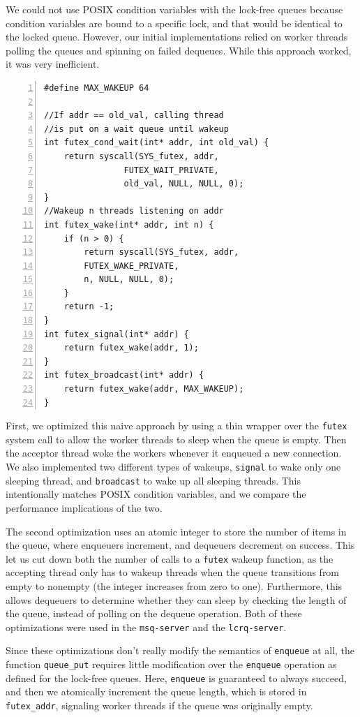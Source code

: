 \documentclass[twoside,10pt]{article}
\begin{document}
\begin{multicols}{2}
We could not use POSIX condition variables with the lock-free queues
because condition variables are bound to a specific lock, and that
would be identical to the locked queue. However, our initial
implementations relied on worker threads polling the queues and
spinning on failed dequeues. While this approach worked, it was very
inefficient. 

\begin{Verbatim}[numbers=left,
                 fontsize=\small]
#define MAX_WAKEUP 64

//If addr == old_val, calling thread
//is put on a wait queue until wakeup
int futex_cond_wait(int* addr, int old_val) {
    return syscall(SYS_futex, addr, 
                FUTEX_WAIT_PRIVATE, 
                old_val, NULL, NULL, 0); 
}
//Wakeup n threads listening on addr
int futex_wake(int* addr, int n) {
    if (n > 0) {
        return syscall(SYS_futex, addr, 
        FUTEX_WAKE_PRIVATE, 
        n, NULL, NULL, 0); 
    }
    return -1;
}
int futex_signal(int* addr) {
    return futex_wake(addr, 1); 
}
int futex_broadcast(int* addr) {
    return futex_wake(addr, MAX_WAKEUP); 
}
\end{Verbatim}

First, we optimized this naive approach by using a thin
wrapper over the \verb+futex+ system call to allow the worker threads
to sleep when the queue is empty. Then the acceptor thread woke the
workers whenever it enqueued a new connection.  We also implemented
two different types of wakeups, \verb+signal+ to wake only one
sleeping thread, and \verb+broadcast+ to wake up all sleeping threads.
This intentionally matches POSIX condition variables, and we compare
the performance implications of the two. 

The second optimization uses
an atomic integer to store the number of items in the queue, where
enqueuers increment, and dequeuers decrement on success. This let us
cut down both the number of calls to a \verb+futex+ wakeup function,
as the accepting thread only has to wakeup threads when the queue
transitions from empty to nonempty (the integer increases from zero to
one). Furthermore, this allows dequeuers to determine whether they can
sleep by checking the length of the queue, instead of polling on the
dequeue operation. Both of these optimizations were used in the
\verb+msq-server+ and the \verb+lcrq-server+. 

Since these optimizations don't really modify the semantics of
\verb+enqueue+ at all, the function \verb+queue_put+ requires little
modification over the \verb+enqueue+ operation as defined for the
lock-free queues. Here, \verb+enqueue+ is guaranteed to always
succeed, and then we atomically increment the queue length, which is
stored in \verb+futex_addr+, signaling worker threads if the queue was
originally empty.


\end{multicols}
\end{document}

